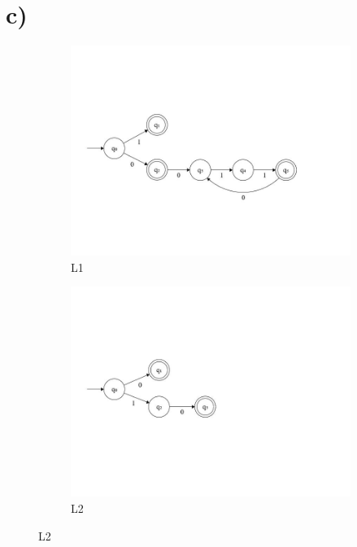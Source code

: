 \section{c)}
\begin{figure}[hbt]
\centering
\begin{subfigure}{0.7\textwidth}
\centering
\includegraphics[width=\textwidth]{Immagini/L1.jpeg}
\caption{L1}
\label{fig:L1}
\end{subfigure}
\begin{subfigure}{0.7\textwidth}
\centering
\includegraphics[width=\textwidth]{Immagini/L2.jpeg}
\caption{L2}
\label{fig:L2}
\end{subfigure}
\label{fig:combined}
\end{figure}

